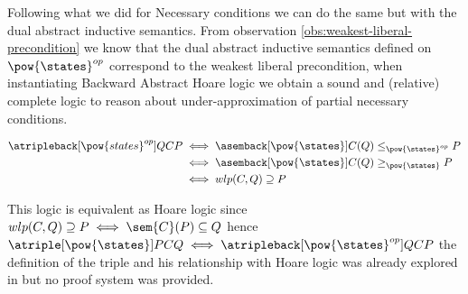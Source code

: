 Following what we did for Necessary conditions we can do the same but with the
dual abstract inductive semantics. From observation 
\ref{obs:weakest-liberal-precondition} we know that the dual abstract inductive 
semantics defined on $\pow{\states}^{op}$ correspond to the weakest liberal 
precondition, when instantiating Backward Abstract Hoare logic we obtain a sound
and (relative) complete logic to reason about under-approximation of partial 
necessary conditions.

\begin{align*}
  \atripleback[\pow{states}^{op}]{Q}{C}{P}
    & \iff \asemback[\pow{\states}]{C}(Q) \leq_{\pow{\states}^{op}} P \\
    & \iff \asemback[\pow{\states}]{C}(Q) \geq_{\pow{\states}} P \\
    & \iff wlp(C, Q) \supseteq P \\
\end{align*}

This logic is equivalent as Hoare logic since $wlp(C, Q) \supseteq P \iff 
\sem{C}(P) \subseteq Q$ hence $\atriple[\pow{\states}]{P}{C}{Q} \iff 
\atripleback[\pow{\states}^{op}]{Q}{C}{P}$ the definition of the triple
and his relationship with Hoare logic was already explored in \cite{Zhang22}
but no proof system was provided.

